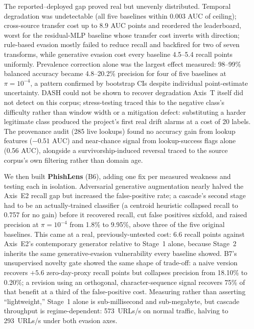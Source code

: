\documentclass[conference]{IEEEtran}
\begin{document}
The reported--deployed gap proved real but unevenly distributed.
Temporal degradation was undetectable (all five baselines within 0.003
AUC of ceiling); cross-source transfer cost up to 8.9 AUC points and
reordered the leaderboard, worst for the residual-MLP baseline whose
transfer cost inverts with direction; rule-based evasion mostly failed to
reduce recall and backfired for two of seven transforms, while generative
evasion cost every baseline 4.5--5.4 recall points uniformly. Prevalence
correction alone was the largest effect measured: 98--99\% balanced
accuracy became 4.8--20.2\% precision for four of five baselines at
$\pi{=}10^{-4}$, a pattern confirmed by bootstrap CIs despite individual
point-estimate uncertainty. DASH could not be shown to recover
degradation Axis~T itself did not detect on this corpus; stress-testing
traced this to the negative class's difficulty rather than window width or a mitigation defect: substituting a harder
legitimate class produced
the project's first real drift alarms at a cost of 20 labels. The
provenance audit (285 live lookups) found no accuracy gain from lookup
features ($-0.51$ AUC) and near-chance signal from lookup-success flags
alone (0.56 AUC), alongside a survivorship-induced reversal traced to the
source corpus's own filtering rather than domain age.

We then built \textbf{PhishLens} (B6), adding one fix per measured
weakness and testing each in isolation. Adversarial generative
augmentation nearly halved the Axis~E2 recall gap but increased the
false-positive rate; a cascade's second stage had to be an actually-trained classifier (a centroid heuristic collapsed
recall to 0.757 for no gain) before it recovered recall, cut false positives
sixfold, and raised precision at $\pi{=}10^{-4}$ from 1.8\% to 9.95\%,
above three of the five original baselines. This came at a real,
previously-untested cost: 6.6 recall points against Axis~E2's
contemporary generator relative to Stage~1 alone, because Stage~2
inherits the same generative-evasion vulnerability every baseline showed.
B7's unsupervised novelty gate showed the same shape of trade-off: a
naive version recovers $+5.6$ zero-day-proxy recall points but collapses
precision from 18.10\% to 0.20\%; a revision using an orthogonal,
character-sequence signal recovers 75\% of that benefit at a third of the
false-positive cost. Measuring rather than asserting ``lightweight,''
Stage~1 alone is sub-millisecond and sub-megabyte, but cascade throughput
is regime-dependent: 573~URLs/s on normal traffic, halving to
293~URLs/s under both evasion axes.
\end{document}
